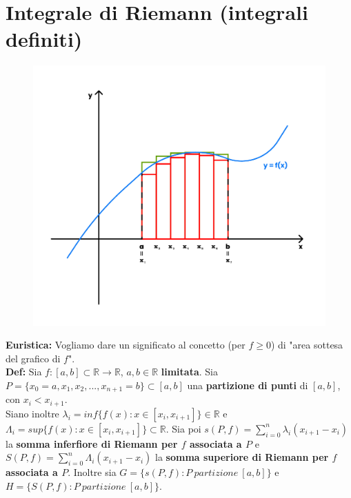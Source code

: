 \documentclass{article}
\begin{document}
\section{Integrale di Riemann (integrali definiti)}
\begin{figure}
\includegraphics[width=1.\linewidth]{images/riemann.pdf} 
\end{figure}

\textbf{Euristica: } Vogliamo dare un significato al concetto (per $f \geq 0$) di "area sottesa del grafico di $f$".\\ 

\noindent\textbf{Def:} Sia $f: [a, b] \subset \mathbb{R} \xrightarrow{} \mathbb{R}$, $a, b \in \mathbb{R}$ \textbf{limitata}. Sia $P = \{x_0 = a, x_1, x_2, ..., x_{n + 1} = b\} \subset [a, b]$ una \textbf{partizione di punti} di $[a, b]$, con $x_i < x_{i + 1}$. \\
Siano inoltre $\lambda_i = inf\{f(x) : x \in [x_i, x_{i + 1}]\} \in \mathbb{R}$ e $\Lambda_i = sup\{f(x) : x \in [x_i, x_{i + 1}]\} \subset \mathbb{R}$. Sia poi $s(P, f) = \sum_{i = 0}^n \lambda_i (x_{i + 1} - x_i)$ la \textbf{somma inferfiore di Riemann per $f$ associata a $P$} e $S(P, f) = \sum_{i = 0}^n \Lambda_i (x_{i + 1} - x_i)$ la \textbf{somma superiore di Riemann per $f$ associata a $P$}. Inoltre sia $G = \{s(P, f) : P \ partizione \ [a, b]\}$ e $H = \{S(P, f) : P \ partizione \ [a, b]\}$.\\
\end{document}
